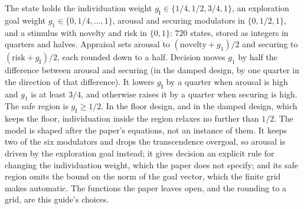 \documentclass[11pt]{article}
\theoremstyle{definition}
\theoremstyle{plain}
\begin{document}
The state holds the individuation weight $g_{\mathrm{I}}\in\{1/4,1/2,3/4,1\}$, an exploration goal
weight $g_1\in\{0,1/4,\dots,1\}$, arousal and securing modulators in $\{0,1/2,1\}$, and a stimulus
with novelty and risk in $\{0,1\}$: $720$ states, stored as integers in quarters and halves.
Appraisal sets arousal to $(\text{novelty}+g_1)/2$ and securing to $(\text{risk}+g_{\mathrm{I}})/2$,
each rounded down to a half. Decision moves $g_1$ by half the difference between arousal and
securing (in the damped design, by one quarter in the direction of that difference). It lowers
$g_{\mathrm{I}}$ by a quarter when arousal is high and $g_1$ is at least $3/4$, and otherwise raises
it by a quarter when securing is high. The safe region is $g_{\mathrm{I}}\ge1/2$. In the floor design,
and in the damped design, which keeps the floor, individuation inside the region relaxes no further
than $1/2$. The model is shaped after the paper's equations, not an instance of them. It keeps two
of the six modulators and drops the transcendence overgoal, so arousal is driven by the exploration
goal instead; it gives decision an explicit rule for changing the individuation weight, which the
paper does not specify; and its safe region omits the bound on the norm of the goal vector, which
the finite grid makes automatic. The functions the paper leaves open, and the rounding to a grid,
are this guide's choices.
\end{document}
